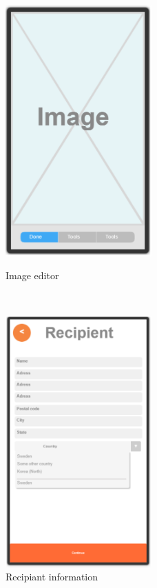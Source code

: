 \documentclass[10pt,a4paper]{article}
\begin{document}
\begin{figure}[p]
\begin{minipage}{0.5\textwidth}
		\label{fig:p2}
	\end{minipage}\\[0.5cm]
	\begin{minipage}{0.5\textwidth}
		\centering
		\includegraphics[width=0.5\textwidth]{Prototype_img/p3.png}
		\caption{Image editor}
		\label{fig:p3}
	\end{minipage}~
	\begin{minipage}{0.5\textwidth}
		\centering
		\includegraphics[width=0.5\textwidth]{Prototype_img/p4.png}
		\caption{Recipiant information}
		\label{fig:p4}
	\end{minipage}


\end{figure}
\FloatBarrier
\end{document}
